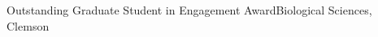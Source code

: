 \begin{cvtable}
    {Outstanding Graduate Student in Engagement Award}{Biological Sciences, Clemson}
    {}
\end{cvtable}